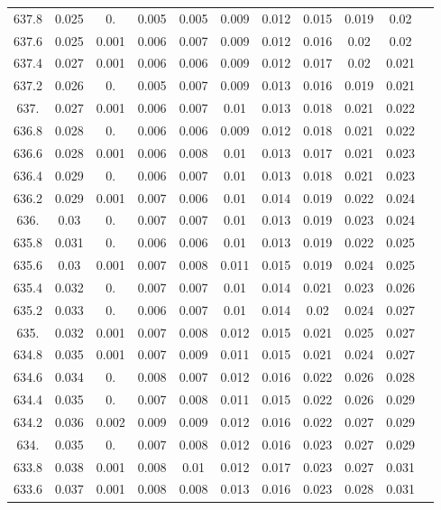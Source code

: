 \documentclass[12pt]{ctexart}
\numberwithin{equation}{section}
\begin{document}
\begin{longtable}{ccccccccccc}
637.8	&	0.025	&	0.	&	0.005	&	0.005	&	0.009	&	0.012	&	0.015	&	0.019	&	0.02	\\
637.6	&	0.025	&	0.001	&	0.006	&	0.007	&	0.009	&	0.012	&	0.016	&	0.02	&	0.02	\\
637.4	&	0.027	&	0.001	&	0.006	&	0.006	&	0.009	&	0.012	&	0.017	&	0.02	&	0.021	\\
637.2	&	0.026	&	0.	&	0.005	&	0.007	&	0.009	&	0.013	&	0.016	&	0.019	&	0.021	\\
637.	&	0.027	&	0.001	&	0.006	&	0.007	&	0.01	&	0.013	&	0.018	&	0.021	&	0.022	\\
636.8	&	0.028	&	0.	&	0.006	&	0.006	&	0.009	&	0.012	&	0.018	&	0.021	&	0.022	\\
636.6	&	0.028	&	0.001	&	0.006	&	0.008	&	0.01	&	0.013	&	0.017	&	0.021	&	0.023	\\
636.4	&	0.029	&	0.	&	0.006	&	0.007	&	0.01	&	0.013	&	0.018	&	0.021	&	0.023	\\
636.2	&	0.029	&	0.001	&	0.007	&	0.006	&	0.01	&	0.014	&	0.019	&	0.022	&	0.024	\\
636.	&	0.03	&	0.	&	0.007	&	0.007	&	0.01	&	0.013	&	0.019	&	0.023	&	0.024	\\
635.8	&	0.031	&	0.	&	0.006	&	0.006	&	0.01	&	0.013	&	0.019	&	0.022	&	0.025	\\
635.6	&	0.03	&	0.001	&	0.007	&	0.008	&	0.011	&	0.015	&	0.019	&	0.024	&	0.025	\\
635.4	&	0.032	&	0.	&	0.007	&	0.007	&	0.01	&	0.014	&	0.021	&	0.023	&	0.026	\\
635.2	&	0.033	&	0.	&	0.006	&	0.007	&	0.01	&	0.014	&	0.02	&	0.024	&	0.027	\\
635.	&	0.032	&	0.001	&	0.007	&	0.008	&	0.012	&	0.015	&	0.021	&	0.025	&	0.027	\\
634.8	&	0.035	&	0.001	&	0.007	&	0.009	&	0.011	&	0.015	&	0.021	&	0.024	&	0.027	\\
634.6	&	0.034	&	0.	&	0.008	&	0.007	&	0.012	&	0.016	&	0.022	&	0.026	&	0.028	\\
634.4	&	0.035	&	0.	&	0.007	&	0.008	&	0.011	&	0.015	&	0.022	&	0.026	&	0.029	\\
634.2	&	0.036	&	0.002	&	0.009	&	0.009	&	0.012	&	0.016	&	0.022	&	0.027	&	0.029	\\
634.	&	0.035	&	0.	&	0.007	&	0.008	&	0.012	&	0.016	&	0.023	&	0.027	&	0.029	\\
633.8	&	0.038	&	0.001	&	0.008	&	0.01	&	0.012	&	0.017	&	0.023	&	0.027	&	0.031	\\
633.6	&	0.037	&	0.001	&	0.008	&	0.008	&	0.013	&	0.016	&	0.023	&	0.028	&	0.031	\\

\end{longtable}
\end{document}
